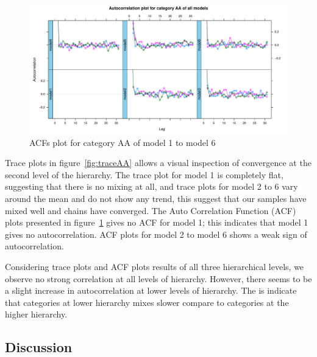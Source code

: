 \begin{figure}[!ht]
	\centering
	\includegraphics[width=1.0\linewidth]{../../R-codes/JAGS/plots/findmodel/AcfAA3abn.PDF}
	\caption{ACFs plot for category AA of model 1 to model 6}
	\label{fig:ACFAA}
\end{figure}

Trace plots in figure~\ref{fig:traceAA} allows a visual inspection of convergence at the second level of the hierarchy. The trace plot for model 1 is completely flat, suggesting that there is no mixing at all, and trace plots for model 2 to 6 vary around the mean and do not show any trend, this suggest that our samples have mixed well and chains have converged. The Auto Correlation Function (ACF) plots presented in figure~\ref{fig:ACFAA} gives no ACF for model 1; this indicates that model 1 gives no autocorrelation. ACF plots for model 2 to model 6 shows a weak sign of autocorrelation. 

\newpage

Considering trace plots and ACF plots results of all three hierarchical levels, we observe no strong correlation at all levels of hierarchy. However, there seems to be a slight increase in autocorrelation at lower levels of hierarchy. The is indicate that categories at lower hierarchy mixes slower compare to categories at the higher hierarchy.

\subsection{Discussion}

